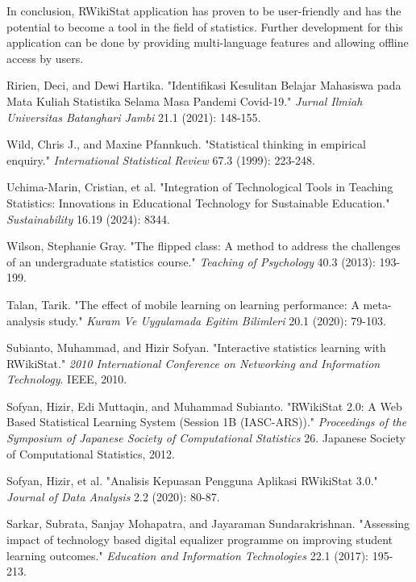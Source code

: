 \documentclass[conference,a4paper]{IEEEtran}
\begin{document}
In conclusion, RWikiStat application has proven to be user-friendly and has the potential to become a tool in the field of statistics. Further development for this application can be done by providing multi-language features and allowing offline access by users.


\balance

\begin{thebibliography}{00}

   Ririen, Deci, and Dewi Hartika. "Identifikasi Kesulitan Belajar Mahasiswa pada Mata Kuliah Statistika Selama Masa Pandemi Covid-19." \textit{Jurnal Ilmiah Universitas Batanghari Jambi} 21.1 (2021): 148-155.

   Wild, Chris J., and Maxine Pfannkuch. "Statistical thinking in empirical enquiry." \textit{International Statistical Review} 67.3 (1999): 223-248.

   Uchima-Marin, Cristian, et al. "Integration of Technological Tools in Teaching Statistics: Innovations in Educational Technology for Sustainable Education." \textit{Sustainability} 16.19 (2024): 8344.

   Wilson, Stephanie Gray. "The flipped class: A method to address the challenges of an undergraduate statistics course." \textit{Teaching of Psychology} 40.3 (2013): 193-199.

   Talan, Tarik. "The effect of mobile learning on learning performance: A meta-analysis study." \textit{Kuram Ve Uygulamada Egitim Bilimleri} 20.1 (2020): 79-103.

   Subianto, Muhammad, and Hizir Sofyan. "Interactive statistics learning with RWikiStat." \textit{2010 International Conference on Networking and Information Technology}. IEEE, 2010.

   Sofyan, Hizir, Edi Muttaqin, and Muhammad Subianto. "RWikiStat 2.0: A Web Based Statistical Learning System (Session 1B (IASC-ARS))." \textit{Proceedings of the Symposium of Japanese Society of Computational Statistics} 26. Japanese Society of Computational Statistics, 2012.

   Sofyan, Hizir, et al. "Analisis Kepuasan Pengguna Aplikasi RWikiStat 3.0." \textit{Journal of Data Analysis} 2.2 (2020): 80-87.

   Sarkar, Subrata, Sanjay Mohapatra, and Jayaraman Sundarakrishnan. "Assessing impact of technology based digital equalizer programme on improving student learning outcomes." \textit{Education and Information Technologies} 22.1 (2017): 195-213.


\end{thebibliography}
\end{document}
